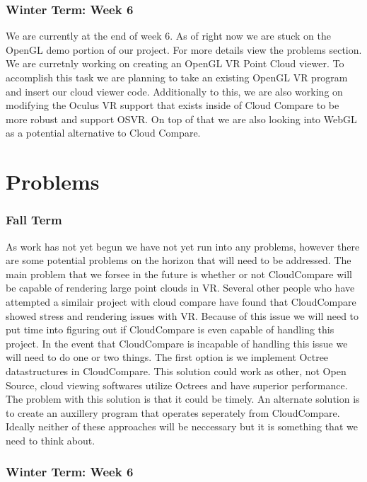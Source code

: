 \documentclass{article}
\begin{document}
\subsubsection{Winter Term: Week 6}

We are currently at the end of week 6. 
As of right now we are stuck on the OpenGL demo portion of our project.
For more details view the problems section.
We are curretnly working on creating an OpenGL VR Point Cloud viewer.
To accomplish this task we are planning to take an existing OpenGL VR program and insert our cloud viewer code.
Additionally to this, we are also working on modifying the Oculus VR support that exists inside of Cloud Compare to be more robust and support OSVR.
On top of that we are also looking into WebGL as a potential alternative to Cloud Compare.

\section{Problems}

\subsubsection{Fall Term}

As work has not yet begun we have not yet run into any problems, however there are some potential problems on the horizon that will need to be addressed.
The main problem that we forsee in the future is whether or not CloudCompare will be capable of rendering large point clouds in VR.
Several other people who have attempted a similair project with cloud compare have found that CloudCompare showed stress and rendering issues with VR.
Because of this issue we will need to put time into figuring out if CloudCompare is even capable of handling this project.
In the event that CloudCompare is incapable of handling this issue we will need to do one or two things.
The first option is we implement Octree datastructures in CloudCompare.
This solution could work as other, not Open Source, cloud viewing softwares utilize Octrees and have superior performance.
The problem with this solution is that it could be timely.
An alternate solution is to create an auxillery program that operates seperately from CloudCompare.
Ideally neither of these approaches will be neccessary but it is something that we need to think about.

\subsubsection{Winter Term: Week 6}
\end{document}
